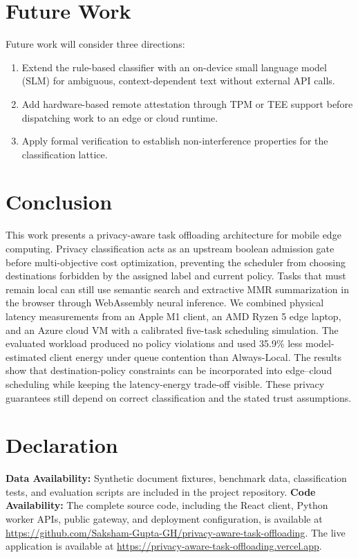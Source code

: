 \documentclass[conference]{IEEEtran}
\begin{document}
\section{Future Work}

Future work will consider three directions:
\begin{enumerate}
  \item Extend the rule-based classifier with an on-device small language model (SLM) for ambiguous, context-dependent text without external API calls.
  \item Add hardware-based remote attestation through TPM or TEE support before dispatching work to an edge or cloud runtime.
  \item Apply formal verification to establish non-interference properties for the classification lattice.
\end{enumerate}

\section{Conclusion}

This work presents a privacy-aware task offloading architecture for mobile edge computing.
Privacy classification acts as an upstream boolean admission gate before multi-objective cost optimization, preventing the scheduler from choosing destinations forbidden by the assigned label and current policy.
Tasks that must remain local can still use semantic search and extractive MMR summarization in the browser through WebAssembly neural inference.
We combined physical latency measurements from an Apple M1 client, an AMD Ryzen 5 edge laptop, and an Azure cloud VM with a calibrated five-task scheduling simulation. The evaluated workload produced no policy violations and used 35.9\% less model-estimated client energy under queue contention than Always-Local.
The results show that destination-policy constraints can be incorporated into edge--cloud scheduling while keeping the latency-energy trade-off visible. These privacy guarantees still depend on correct classification and the stated trust assumptions.

\section*{Declaration}
\textbf{Data Availability:} Synthetic document fixtures, benchmark data, classification tests, and evaluation scripts are included in the project repository.
\textbf{Code Availability:} The complete source code, including the React client, Python worker APIs, public gateway, and deployment configuration, is available at \url{https://github.com/Saksham-Gupta-GH/privacy-aware-task-offloading}.
The live application is available at \url{https://privacy-aware-task-offloading.vercel.app}.
\end{document}

